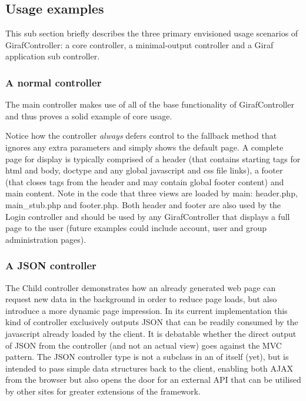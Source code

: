 \subsection{Usage examples}
This sub section briefly describes the three primary envisioned usage scenarios of GirafController: a core controller, a minimal-output controller and a Giraf application sub controller.

\subsubsection*{A normal controller}
The main controller makes use of all of the base functionality of GirafController and thus proves a solid example of core usage. 



Notice how the controller \emph{always} defers control to the fallback method that ignores any extra parameters and simply shows the default page. A complete page for display is typically comprised of a header (that contains starting tags for html and body, doctype and any global javascript and css file links), a footer (that closes tags from the header and may contain global footer content) and main content. Note in the code that three views are loaded by main: header.php, main\_stub.php and footer.php. Both header and footer are also used by the Login controller and should be used by any GirafController that displays a full page to the user (future examples could include account, user and group administration pages).

\subsubsection*{A JSON controller}


The Child controller demonstrates how an already generated web page can request new data in the background in order to reduce page loads, but also introduce a more dynamic page impression. In its current implementation this kind of controller exclusively outputs JSON that can be readily consumed by the javascript already loaded by the client. It is debatable whether the direct output of JSON from the controller (and not an actual view) goes against the MVC pattern.
The JSON controller type is not a subclass in an of itself (yet), but is intended to pass simple data structures back to the client, enabling both AJAX from the browser but also opens the door for an external API that can be utilised by other sites for greater extensions of the framework.

